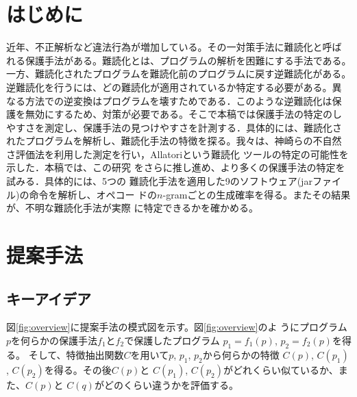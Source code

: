 \documentclass[a4j,fleqn,10pt]{jarticle}
\newcommand{\birth}[1]{$C(#1)$}
\begin{document}

\maketitle


\section{はじめに}

近年、不正解析など違法行為が増加している。その一対策手法に難読化と呼ば
れる保護手法がある。難読化とは、プログラムの解析を困難にする手法である。
一方、難読化されたプログラムを難読化前のプログラムに戻す逆難読化がある。
逆難読化を行うには、どの難読化が適用されているか特定する必要がある。異
なる方法での逆変換はプログラムを壊すためである．このような逆難読化は保
護を無効にするため、対策が必要である。そこで本稿では保護手法の特定のし
やすさを測定し、保護手法の見つけやすさを計測する．具体的には、難読化さ
れたプログラムを解析し、難読化手法の特徴を探る。我々は、神崎らの不自然
さ評価法\cite{kanzaki14ipsj}を利用した測定を行い，Allatoriという難読化
ツールの特定の可能性を示した\cite{sagisaka15sigss}．本稿では、この研究
をさらに推し進め、より多くの保護手法の特定を試みる．具体的には、5つの
難読化手法を適用した9のソフトウェア(jarファイル)の命令を解析し、オペコー
ドの$n$-gramごとの生成確率を得る。またその結果が、不明な難読化手法が実際
に特定できるかを確かめる。

\section{提案手法}\label{sect:proposedmethod}

\subsection{キーアイデア}\label{sect:keyidea}

図\ref{fig:overview}に提案手法の模式図を示す。図\ref{fig:overview}のよ
うにプログラム$p$を何らかの保護手法$f_1$と$f_2$で保護したプログラム
$p_1=f_1(p)$, $p_2=f_2(p)$を得る。
%
そして、特徴抽出関数$C$を用いて$p$, $p_1$, $p_2$から何らかの特徴
\birth{p}, \birth{p_1}, \birth{p_2}を得る。その後\birth{p}と
\birth{p_1}, \birth{p_2}がどれくらい似ているか、また、\birth{p}と
\birth{q}がどのくらい違うかを評価する。
\end{document}
